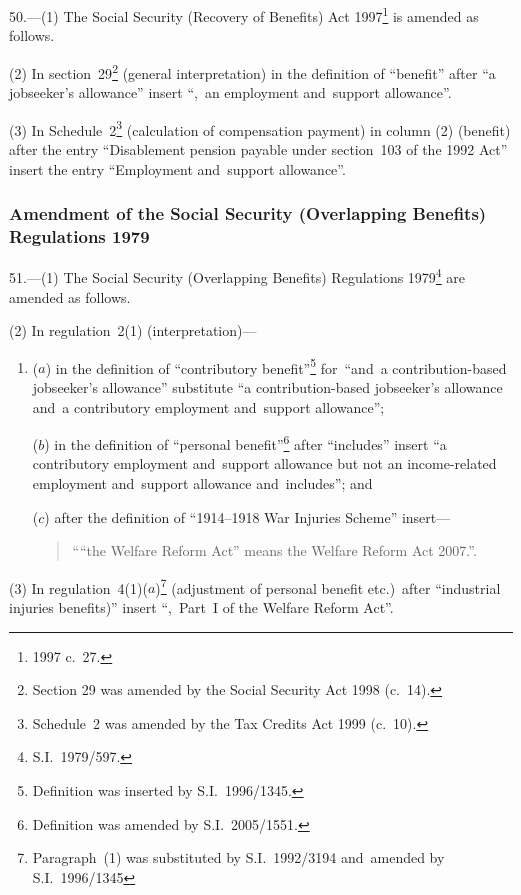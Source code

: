 \documentclass[12pt,a4paper]{article}
\begin{document}
50.---(1)  The Social Security (Recovery of Benefits) Act 1997\footnote{1997 c.~27.} is amended as follows.

(2) In section~29\footnote{Section 29 was amended by the Social Security Act 1998 (c.~14).} (general interpretation) in the definition of “benefit” after “a jobseeker’s allowance” insert “,~an employment and~support allowance”.

(3) In Schedule~2\footnote{Schedule~2 was amended by the Tax Credits Act 1999 (c.~10).} (calculation of compensation payment) in column (2) (benefit) after the entry “Disablement pension payable under section~103 of the 1992 Act” insert the entry “Employment and~support allowance”.

\subsubsection[51. Amendment of the Social Security (Overlapping Benefits) Regulations 1979]{Amendment of the Social Security (Overlapping Benefits) Regulations 1979}

51.---(1)  The Social Security (Overlapping Benefits) Regulations 1979\footnote{S.I.~1979/597.} are amended as follows.

(2) In regulation~2(1) (interpretation)—
\begin{enumerate}\item[]
($a$) in the definition of “contributory benefit”\footnote{Definition was inserted by S.I.~1996/1345.} for~“and~a contribution-based jobseeker’s allowance” substitute “a contribution-based jobseeker’s allowance and~a contributory employment and~support allowance”;

($b$) in the definition of “personal benefit”\footnote{Definition was amended by S.I.~2005/1551.} after “includes” insert “a contributory employment and~support allowance but not an income-related employment and~support allowance and~includes”; and

($c$) after the definition of “1914--1918 War Injuries Scheme” insert—
\begin{quotation}
““the Welfare Reform Act” means the Welfare Reform Act 2007.”.
\end{quotation}
\end{enumerate}

(3) In regulation~4(1)($a$)\footnote{Paragraph~(1) was substituted by S.I.~1992/3194 and~amended by S.I.~1996/1345} (adjustment of personal benefit etc.)\ after “industrial injuries benefits)” insert “,~Part~I of the Welfare Reform Act”.
\end{document}
